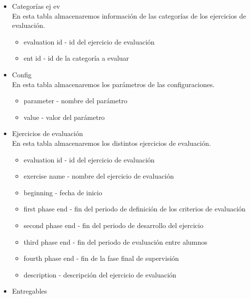 \begin{itemize}
	\item Categorías ej ev\\
	
	En esta tabla almacenaremos información de las categorías de los ejercicios de evaluación.\\
	
	\begin{itemize}
		\item evaluation id - id del ejercicio de evaluación
		\item ent id - id de la categoría a evaluar
	\end{itemize}
	
	\item Config\\
	
	En esta tabla almacenaremos los parámetros de las configuraciones.
	
	\begin{itemize}
		\item parameter - nombre del parámetro
		\item value - valor del parámetro
	\end{itemize}
	
	\item Ejercicios de evaluación\\
	
	En esta tabla almacenaremos los distintos ejercicios de evaluación.
	
	\begin{itemize}
		\item evaluation id - id del ejercicio de evaluación
		\item exercise name - nombre del ejercicio de evaluación
		\item beginning - fecha de inicio
		\item first phase end - fin del periodo de definición de los criterios de evaluación
		\item second phase end - fin del periodo de desarrollo del ejercicio
		\item third phase end - fin del periodo de evaluación entre alumnos
		\item fourth phase end - fin de la fase final de supervisión
		\item description - descripción del ejercicio de evaluación
	\end{itemize}
	
	\item Entregables\\
	

\end{itemize}

